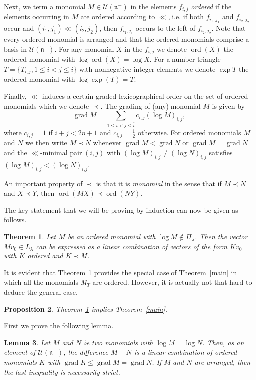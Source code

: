\documentclass[10pt,a4paper]{article}
\newtheorem{theo}{Theorem}[section]
\newtheorem{prop}[theo]{Proposition}
\newtheorem{lemm}[theo]{Lemma}
\theoremstyle{remark}\newtheorem{rema}[theo]{Remark}
\DeclareMathOperator{\ord}{ord}
\DeclareMathOperator{\grad}{grad}
\newcommand{\la}{\lambda}
\begin{document}
Next, we term a monomial $M\in\mathcal U(\mathfrak n^-)$ in the elements $f_{i,j}$ \emph{ordered} if the elements occurring in $M$ are ordered according to $\ll$, i.e. if both $f_{i_1,j_1}$ and $f_{i_2,j_2}$ occur and $(i_1,j_1)\ll(i_2,j_2)$, then $f_{i_1,j_1}$ occurs to the left of $f_{i_2,j_2}$. Note that every ordered monomial is arranged and that the ordered monomials comprise a basis in $\mathcal U(\mathfrak n^-)$. For any monomial $X$ in the $f_{i,j}$ we denote $\ord(X)$ the ordered monomial with $\log\ord(X)=\log X$. For a number triangle $T=\{T_{i,j},1\le i<j\le\overline i\}$ with nonnegative integer elements we denote $\exp T$ the ordered monomial with $\log\exp(T)=T$.

Finally, $\ll$ induces a certain graded lexicographical order on the set of ordered monomials which we denote $\prec$. The grading of (any) monomial $M$ is given by
\[
\grad M=\sum_{1\le i<j\le \overline i}c_{i,j}(\log M)_{i,j},
\]
where $c_{i,j}=1$ if $i+j<2n+1$ and $c_{i,j}=\frac12$ otherwise. For ordered monomials $M$ and $N$ we then write $M\prec N$ whenever $\grad M<\grad N$ or $\grad M=\grad N$ and the $\ll$-minimal pair $(i,j)$ with $(\log M)_{i,j}\neq(\log N)_{i,j}$ satisfies $(\log M)_{i,j}<(\log N)_{i,j}$.

An important property of $\prec$ is that it is \emph{monomial} in the sense that if $M\prec N$ and $X\prec Y$, then $\ord(MX)\prec\ord(NY)$.

The key statement that we will be proving by induction can now be given as follows.

\begin{theo}\label{ind}
Let $M$ be an ordered monomial with $\log M\notin\Pi_\la$. Then the vector $Mv_0\in L_\la$ can be expressed as a linear combination of vectors of the form $Kv_0$ with $K$ ordered and $K\prec M$.
\end{theo}

It is evident that Theorem~\ref{ind} provides the special case of Theorem~\ref{main} in which all the monomials $M_T$ are ordered. However, it is actually not that hard to deduce the general case.

\begin{prop}\label{implies}
Theorem~\ref{ind} implies Theorem~\ref{main}.
\end{prop}

First we prove the following lemma.

\begin{lemm}\label{reorder}
Let $M$ and $N$ be two monomials with $\log M=\log N$. Then, as an element of $\mathcal U(\mathfrak n^-)$, the difference $M-N$ is a linear combination of ordered monomials $K$ with $\grad K\le \grad M=\grad N$. If $M$ and $N$ are arranged, then the last inequality is necessarily strict.
\end{lemm}
\end{document}
